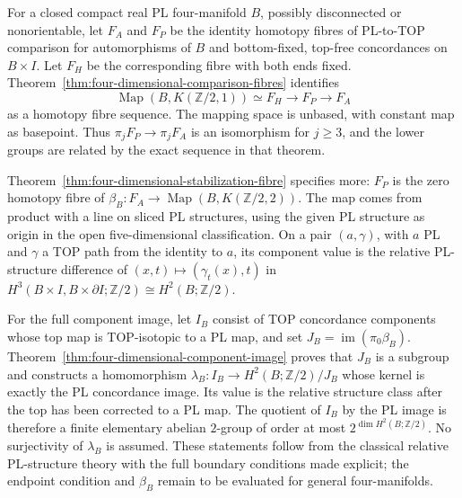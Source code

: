 \documentclass[11pt,a4paper]{article}
\theoremstyle{definition}
\begin{document}
For a closed compact real PL four-manifold $B$, possibly
disconnected or nonorientable, let $F_A$ and $F_P$ be the identity
homotopy fibres of PL-to-TOP comparison for automorphisms of $B$ and
bottom-fixed, top-free concordances on $B\times I$. Let $F_H$ be the
corresponding fibre with both ends fixed. Theorem~\ref{thm:four-dimensional-comparison-fibres}
identifies
\[
 \operatorname{Map}(B,K(\mathbb Z/2,1))\simeq F_H
 \longrightarrow F_P\longrightarrow F_A
\]
as a homotopy fibre sequence. The mapping space is unbased, with
constant map as basepoint. Thus $\pi_jF_P\to\pi_jF_A$ is an
isomorphism for $j\geq3$, and the lower groups are related by the
exact sequence in that theorem.

Theorem~\ref{thm:four-dimensional-stabilization-fibre} specifies more:
$F_P$ is the zero homotopy fibre of
$\beta_B:F_A\to\operatorname{Map}(B,K(\mathbb Z/2,2))$.
The map comes from product with a line on sliced PL structures,
using the given PL structure as origin in the open five-dimensional
classification. On a pair $(a,\gamma)$, with $a$ PL and $\gamma$
a TOP path from the identity to $a$, its component value is the
relative PL-structure difference of $(x,t)\mapsto(\gamma_t(x),t)$
in $H^3(B\times I,B\times\partial I;\mathbb Z/2)
\cong H^2(B;\mathbb Z/2)$.

For the full component image, let $I_B$ consist of TOP concordance
components whose top map is TOP-isotopic to a PL map, and set
$J_B=\operatorname{im}(\pi_0\beta_B)$. Theorem~\ref{thm:four-dimensional-component-image}
proves that $J_B$ is a subgroup and constructs a homomorphism
$\lambda_B:I_B\to H^2(B;\mathbb Z/2)/J_B$ whose kernel is exactly
the PL concordance image. Its value is the relative structure class
after the top has been corrected to a PL map. The quotient of $I_B$
by the PL image is therefore a finite elementary abelian $2$-group
of order at most $2^{\dim H^2(B;\mathbb Z/2)}$. No surjectivity of
$\lambda_B$ is assumed. These statements follow from the classical
relative PL-structure theory with the full boundary conditions made
explicit; the endpoint condition and $\beta_B$ remain to be evaluated
for general four-manifolds.
\end{document}

